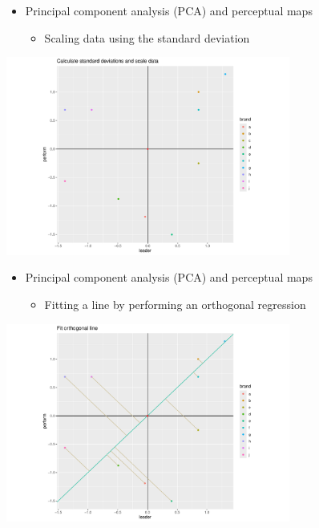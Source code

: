 \documentclass[
  ignorenonframetext,
]{beamer}
\providecommand{\tightlist}{%
  \setlength{\itemsep}{0pt}\setlength{\parskip}{0pt}}\usepackage{longtable,booktabs,array}
\begin{document}
\begin{frame}{}
\label{section-14}
\begin{itemize}
\item
  Principal component analysis (PCA) and perceptual maps

  \begin{itemize}
  \tightlist
  \item
    Scaling data using the standard deviation
  \end{itemize}
\end{itemize}

\begin{center}
\includegraphics[width=0.7\textwidth,height=\textheight]{008_reducing_data_complexity_files/figure-beamer/unnamed-chunk-13-1.pdf}
\end{center}
\end{frame}

\begin{frame}{}
\label{section-15}
\begin{itemize}
\item
  Principal component analysis (PCA) and perceptual maps

  \begin{itemize}
  \tightlist
  \item
    Fitting a line by performing an orthogonal regression
  \end{itemize}
\end{itemize}

\begin{center}
\includegraphics[width=0.7\textwidth,height=\textheight]{008_reducing_data_complexity_files/figure-beamer/unnamed-chunk-14-1.pdf}
\end{center}
\end{frame}
\end{document}
